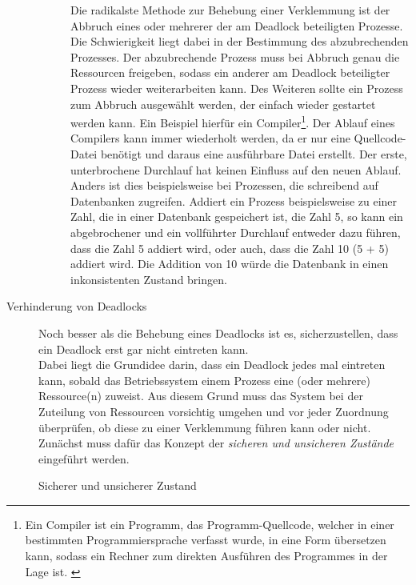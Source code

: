 \begin{description}
\begin{description}
								Die radikalste Methode zur Behebung einer Verklemmung ist der Abbruch eines oder mehrerer der am Deadlock beteiligten Prozesse. Die Schwierigkeit liegt dabei in der Bestimmung des abzubrechenden Prozesses. Der abzubrechende Prozess muss bei Abbruch genau die Ressourcen freigeben, sodass ein anderer am Deadlock beteiligter Prozess wieder weiterarbeiten kann. Des Weiteren sollte ein Prozess zum Abbruch ausgewählt werden, der einfach wieder gestartet werden kann. Ein Beispiel hierfür ein Compiler\footnote{Ein Compiler ist ein Programm, das Programm-Quellcode, welcher in einer bestimmten Programmiersprache verfasst wurde, in eine Form übersetzen kann, sodass ein Rechner zum direkten Ausführen des Programmes in der Lage ist. \cite{CompilerWikipedia}}. Der Ablauf eines Compilers kann immer wiederholt werden, da er nur eine Quellcode-Datei benötigt und daraus eine ausführbare Datei erstellt. Der erste, unterbrochene Durchlauf hat keinen Einfluss auf den neuen Ablauf. Anders ist dies beispielsweise bei Prozessen, die schreibend auf Datenbanken zugreifen. Addiert ein Prozess beispielsweise zu einer Zahl, die in einer Datenbank gespeichert ist, die Zahl 5, so kann ein abgebrochener und ein vollführter Durchlauf entweder dazu führen, dass die Zahl 5 addiert wird, oder auch, dass die Zahl 10 (5 + 5) addiert wird. Die Addition von 10 würde die Datenbank in einen inkonsistenten Zustand bringen.								
						\end{description}
					
					\item[Verhinderung von Deadlocks]
					
						Noch besser als die Behebung eines Deadlocks ist es, sicherzustellen, dass ein Deadlock erst gar nicht eintreten kann.\\
						Dabei liegt die Grundidee darin, dass ein Deadlock jedes mal eintreten kann, sobald das Betriebssystem einem Prozess eine (oder mehrere) Ressource(n) zuweist. Aus diesem Grund muss das System bei der Zuteilung von Ressourcen vorsichtig umgehen und vor jeder Zuordnung überprüfen, ob diese zu einer Verklemmung führen kann oder nicht. Zunächst muss dafür das Konzept der \textit{sicheren und unsicheren Zustände} eingeführt werden.
						
						\begin{description}
							\item[Sicherer und unsicherer Zustand]
							

\end{description}
\end{description}
